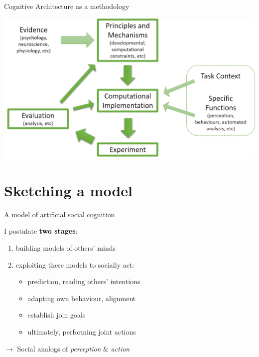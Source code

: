 \documentclass[compress]{beamer}
\begin{document}
{
\begin{frame}{Cognitive Architecture as a methodology}

    \begin{center}
        \includegraphics[width=\linewidth]{cogarch-methodology}
    \end{center}

\end{frame}
}


\section{Sketching a model}


\begin{frame}{A model of artificial social cognition}

    I postulate {\bf two stages}:

    \begin{enumerate}
        \item building models of others' minds
        \item exploiting these models to socially act:
            \begin{itemize}
                \item prediction, reading others' intentions
                \item adapting own behaviour, alignment
                \item establish join goals
                \item ultimately, performing joint actions
            \end{itemize}
    \end{enumerate}

    \vspace{2em}
    $\rightarrow$ Social analogs of \emph{perception} \& \emph{action}

\end{frame}
\end{document}
